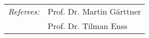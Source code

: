 \begin{titlepage}
    \begin{addmargin}[-1cm]{-3cm}
    \begin{center}
        \large

        \hfill

        \vfill

        \begingroup
            \color{CTtitle} \\ \bigskip
        \endgroup

        \vfill

    \end{center}
    \vfill
    \begin{center}
        \begin{tabular}{ll}
             \textit{Referees:}\hspace{0.5cm} & Prof. Dr. Martin Gärttner\\
             & Prof. Dr. Tilman Enss
        \end{tabular}
    \end{center}
  \end{addmargin}
\end{titlepage}
